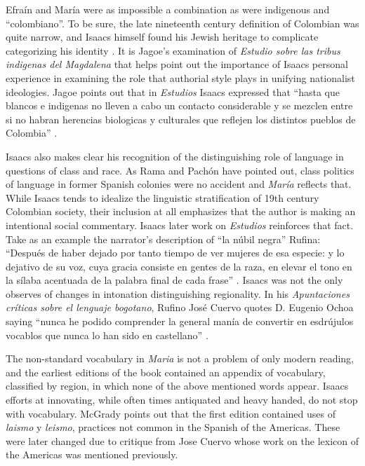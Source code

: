 \documentclass[12pt]{report}
\begin{document}

Efraín and María were as impossible a combination as were indigenous and \enquote{colombiano}.
To be sure, the late nineteenth century definition of Colombian was quite narrow, and Isaacs himself found his Jewish heritage to complicate categorizing his identity \autocite[160]{Jagoe2003}.
It is Jagoe's examination of \textit{Estudio sobre las tribus indigenas del Magdalena} that helps point out the importance of Isaacs personal experience in examining the role that authorial style plays in unifying nationalist ideologies. 
Jagoe points out that in \textit{Estudios} Isaacs expressed that \enquote{hasta que blancos e indigenas no lleven a cabo un contacto considerable y se mezclen entre si no habran herencias biologicas y culturales que reflejen los distintos pueblos de Colombia} \autocite[160]{Jagoe2003}.


Isaacs also makes clear his recognition of the distinguishing role of language in questions of class and race.
As Rama and Pachón have pointed out, class politics of language in former Spanish colonies were no accident and \textit{María} reflects that.
While Isaacs tends to idealize the linguistic stratification of 19th century Colombian society, their inclusion at all emphasizes that the author is making an intentional social commentary.
Isaacs later work on \textit{Estudios} reinforces that fact.
Take as an example the narrator's description of \enquote{la núbil negra} Rufina:
\enquote{Después de haber dejado por tanto tiempo de ver mujeres de esa especie: y lo dejativo de su voz, cuya gracia consiste en gentes de la raza, en elevar el tono en la sílaba acentuada de la palabra final de cada frase} \autocite[304]{Isaacs2012}.
Isaacs was not the only observes of changes in intonation distinguishing regionality.
In his \textit{Apuntaciones críticas sobre el lenguaje bogotano}, Rufino José Cuervo quotes D. Eugenio Ochoa saying \enquote{nunca he podido comprender la general manía de convertir en esdrújulos vocablos que nunca lo han sido en castellano} \autocite[3]{Cuervo1876}.


The non-standard vocabulary in \textit{Maria} is not a problem of only modern reading, and the earliest editions of the book contained an appendix of vocabulary, classified by region, in which none of the above mentioned words appear.
Isaacs efforts at innovating, while often times antiquated and heavy handed, do not stop with vocabulary.
McGrady points out that the first edition contained uses of \textit{laismo} y \textit{leismo}, practices not common in the Spanish of the Americas.
These were later changed due to critique from Jose Cuervo whose work on the lexicon of the Americas was mentioned previously.
\end{document}
